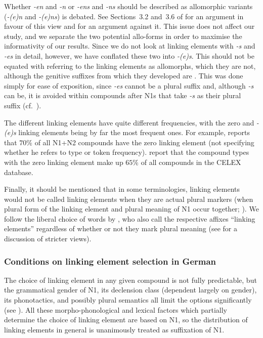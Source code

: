 Whether \textit{-en} and \textit{-n} or \textit{-ens} and \textit{-ns} should be described as allomorphic variants (\ie \textit{-(e)n} and \textit{-(e)ns}) is debated.
See Sections~3.2 and~3.6 of \citet{NueblingSzczepaniak2013} for an argument in favour of this view and \citet[33--36]{Neef2015} for an argument against it.
This issue does not affect our study, and we separate the two potential allo-forms in order to maximise the informativity of our results.
Since we do not look at linking elements with \textit{-s} and \textit{-es} in detail, however, we have conflated these two into \textit{-(e)s}.
This should not be equated with referring to the linking elements as allomorphs, which they are not, although the genitive suffixes from which they developed are \citep[81]{Szczepaniak2016,NueblingSzczepaniak2013}.
This was done simply for ease of exposition, since \textit{-es} cannot be a plural suffix and, although \textit{-s} can be, it is avoided within compounds after N1s that take \textit{-s} as their plural suffix (cf.\ \citealt{Wegener2003,Wegener2005,NueblingSzczepaniak2013}).

The different linking elements have quite different frequencies, with the zero and \textit{-(e)s} linking elements being by far the most frequent ones.
For example, \citet[177]{Gallmann1998} reports that $70\%$ of all N1+N2 compounds have the zero linking element (not specifying whether he refers to type or token frequency).
\citet[29]{KrottEa2007} report that the compound types with the zero linking element make up $65\%$ of all compounds in the CELEX database.

Finally, it should be mentioned that in some terminologies, linking elements would not be called linking elements when they are actual plural markers (\ie when plural form of the linking element and plural meaning of N1 occur together; \citealt{Dressler1987}).
We follow the liberal choice of words by \citet{BangaEa2013b}, who also call the respective affixes ``linking elements'' regardless of whether or not they mark plural meaning (see \citealt[196]{BangaEa2013b} for a discussion of stricter views).

\subsubsection{Conditions on linking element selection in German}
\label{sec:conditionsonlinkageselectioningerman}

The choice of linking element in any given compound is not fully predictable, but the grammatical gender of N1, its declension class (dependent largely on gender), its phonotactics, and possibly plural semantics all limit the options significantly (see \citealt{Fuhrhop1996,NueblingSzczepaniak2013}).
All these morpho-phono\-logical and lexical factors which partially determine the choice of linking element are based on N1, so the distribution of linking elements in general is unanimously treated as suffixation of N1.

